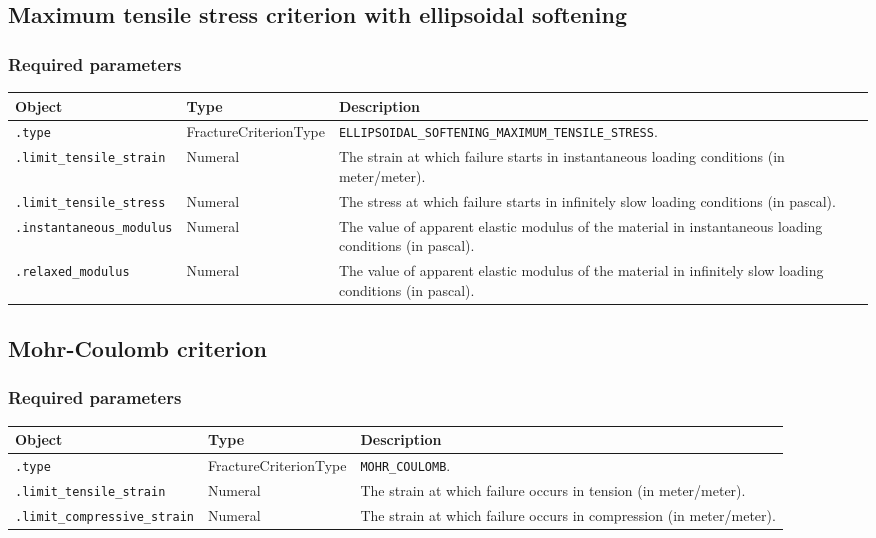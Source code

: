 \documentclass[10pt]{article}
\begin{document}
\subsection{Maximum tensile stress criterion with ellipsoidal softening}

\subsubsection*{Required parameters}

\begin{tabularx}{\textwidth}{llX}
\hline 
Object & Type & Description \\ 
\hline 
\verb+.type+ & FractureCriterionType & \verb+ELLIPSOIDAL_SOFTENING_MAXIMUM_TENSILE_STRESS+. \\ 
\verb+.limit_tensile_strain+ & Numeral & The strain at which failure starts in instantaneous loading conditions (in meter/meter).\\
\verb+.limit_tensile_stress+ & Numeral & The stress at which failure starts in infinitely slow loading conditions  (in pascal).\\
\verb+.instantaneous_modulus+ & Numeral & The value of apparent elastic modulus of the material in instantaneous loading conditions (in pascal).\\
\verb+.relaxed_modulus+ & Numeral & The value of apparent elastic modulus of the material in infinitely slow loading conditions (in pascal).\\
\hline 
\end{tabularx}

\subsection{Mohr-Coulomb criterion}

\subsubsection*{Required parameters}

\begin{tabularx}{\textwidth}{llX}
\hline 
Object & Type & Description \\ 
\hline 
\verb+.type+ & FractureCriterionType & \verb+MOHR_COULOMB+. \\ 
\verb+.limit_tensile_strain+ & Numeral & The strain at which failure occurs in tension (in meter/meter).\\
\verb+.limit_compressive_strain+ & Numeral & The strain at which failure occurs in compression (in meter/meter).\\
\hline 
\end{tabularx}
\end{document}
